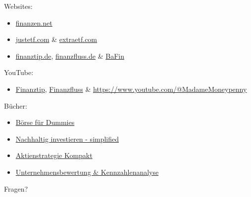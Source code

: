 \documentclass{beamer}
\begin{document}
			\begin{frame}
				Websites:
				\begin{itemize}
					\item \href{https://www.finanzen.net/}{finanzen.net}
					\item \href{https://www.justetf.com/}{justetf.com} \& \href{https://extraetf.com/}{extraetf.com}
					\item \href{https://www.finanztip.de/}{finanztip.de}, \href{https://www.finanzfluss.de/}{finanzfluss.de} \& \href{https://www.bafin.de/DE/Verbraucher/Finanzwissen/finanzwissen_node.html}{BaFin}
				\end{itemize}
				YouTube:
				\begin{itemize}
					\item \href{https://www.youtube.com/@finanztip}{Finanztip}, \href{https://www.youtube.com/@Finanzfluss}{Finanzfluss} \& \href{Madame Moneypenny}{https://www.youtube.com/@MadameMoneypenny}
				\end{itemize}
				Bücher:
				\begin{itemize}
					\item \href{https://www.thalia.de/shop/home/suggestartikel/A1058629085}{Börse für Dummies}
					\item \href{https://www.thalia.de/shop/home/suggestartikel/A1056992675}{Nachhaltig investieren - simplified}
					\item \href{https://www.thalia.de/shop/home/artikeldetails/A1062107486}{Aktienstrategie Kompakt}
					\item \href{https://www.thalia.de/shop/home/suggestartikel/A1058453804}{Unternehmensbewertung \& Kennzahlenanalyse}
				\end{itemize}
			\end{frame}
			
	\appendix
		
	{
		\begin{frame}
			\begin{center}
				\vspace{1.5cm}
				Fragen?
			\end{center}
		\end{frame}
	}
\end{document}
